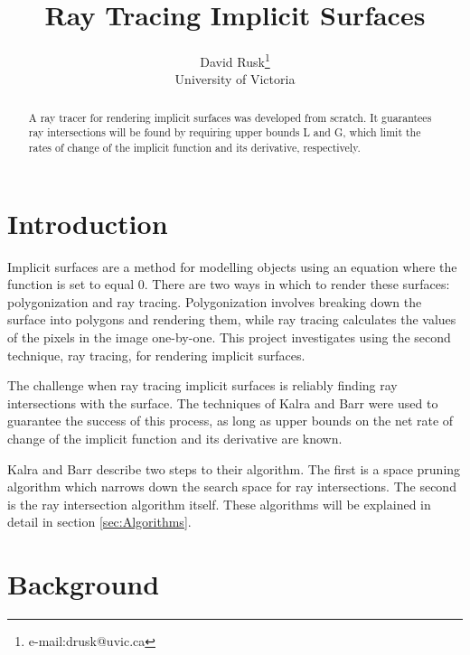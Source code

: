 \documentclass[conference]{acmsiggraph}
\title{Ray Tracing Implicit Surfaces}
\author{David Rusk\thanks{e-mail:drusk@uvic.ca}\\University of Victoria}
\begin{document}
\maketitle

\begin{abstract}

A ray tracer for rendering implicit surfaces was developed from scratch.
It guarantees ray intersections will be found by requiring upper 
bounds L and G, which limit the rates of change of the implicit function 
and its derivative, respectively.

\end{abstract}

\keywordlist


\TOGlinkslist


\copyrightspace

\section{Introduction}

Implicit surfaces are a method for modelling objects using an equation
where the function is set to equal 0.  There are two ways in which to
render these surfaces: polygonization and ray tracing.  Polygonization
involves breaking down the surface into polygons and rendering them, 
while ray tracing calculates the values of the pixels in the image
one-by-one.  This project investigates using the second technique, 
ray tracing, for rendering implicit surfaces.

The challenge when ray tracing implicit surfaces is reliably finding
ray intersections with the surface.  The techniques of Kalra and
Barr \cite{KalraBarr1989} were used to guarantee the success of this
process, as long as upper bounds on the net rate of change of the 
implicit function and its derivative are known.  

Kalra and Barr describe two steps to their algorithm.  The first is a
space pruning algorithm which narrows down the search space for 
ray intersections.  The second is the ray intersection algorithm 
itself.  These algorithms will be explained in detail in section 
\ref{sec:Algorithms}.

\section{Background}
\end{document}
